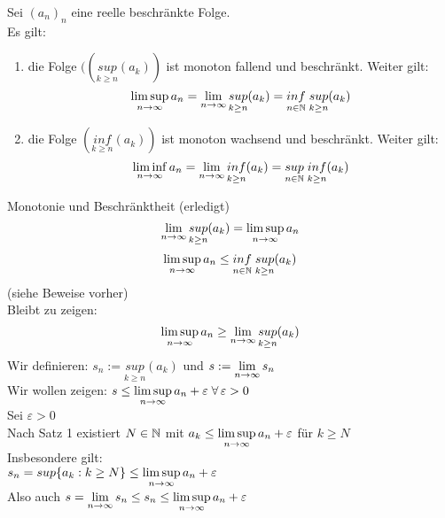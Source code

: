 \documentclass[../ana1u.tex]{subfiles}
\begin{document}
\begin{lem}
    Sei \((a_n)_n \) eine reelle beschränkte Folge. \\
    Es gilt: 
    \begin{enumerate}
        \item 
            die Folge \(((\underset{k \geq n}{sup}(a_k))\) ist monoton fallend und beschränkt. 
            Weiter gilt:
            \[\limsup\limits_{n\rightarrow\infty} a_n = \lim\limits_{n\rightarrow\infty} \underset{k \geq n}{sup} (a_k) = \underset{n \in \mathbb{N}}{inf} \; \underset{k \geq n}{sup} (a_k)\]
        \item 
            die Folge \((\underset{k \geq n}{inf} (a_k))\) ist monoton wachsend und beschränkt.
            Weiter gilt:
            \[\liminf\limits_{n\rightarrow\infty} a_n = \lim\limits_{n\rightarrow\infty} \underset{k \geq n}{inf} (a_k) 
            = \underset{n \in \mathbb{N}}{sup} \; \underset{k \geq n}{inf} (a_k)\]
    \end{enumerate}		
\end{lem}
\begin{bew}
    Monotonie und Beschränktheit (erledigt)
    \[\lim\limits_{n\rightarrow\infty} \underset{k \geq n}{sup} (a_k) = \limsup\limits_{n\rightarrow\infty} a_n \]
    \[\limsup\limits_{n\rightarrow\infty} a_n \leq \underset{n \in \mathbb{N}}{inf} \; \underset{k \geq n}{sup} (a_k) \]
    (siehe Beweise vorher) \\
    Bleibt zu zeigen:
    \[\limsup\limits_{n\rightarrow\infty} a_n \geq \lim\limits_{n\rightarrow\infty} \underset{k \geq n}{sup} (a_k) \]
    Wir definieren: \(s_n := \underset{k \geq n}{sup} (a_k) \) und \(s := \lim\limits_{n\rightarrow\infty} s_n \) \\
    Wir wollen zeigen: 
    \(s \leq \limsup\limits_{n\rightarrow\infty} a_n + \varepsilon \; \forall \, \varepsilon > 0 \) \\
    Sei \(\varepsilon > 0 \) \\
    Nach Satz 1 existiert \(N \in \mathbb{N} \) mit \(a_k \leq \limsup\limits_{n\rightarrow\infty} a_n + \varepsilon \) 
    für \(k \geq N \) \\
    Insbesondere gilt: \\
    \(s_n = sup\{a_k: k \geq N\} \leq \limsup\limits_{n\rightarrow\infty} a_n + \varepsilon \) \\
    Also auch \(s = \lim\limits_{n\rightarrow\infty} s_n \leq s_n \leq \limsup\limits_{n\rightarrow\infty} a_n + \varepsilon \) \\
\end{bew}	
\end{document}
